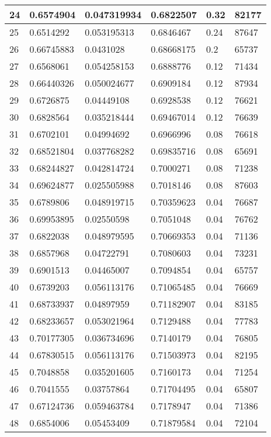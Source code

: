 \begin{longtable}{|l|l|l|l|l|l|}
24 & 0.6574904 & 0.047319934 & 0.6822507 & 0.32 & 82177 \\ \hline 
25 & 0.6514292 & 0.053195313 & 0.6846467 & 0.24 & 87647 \\ \hline 
26 & 0.66745883 & 0.0431028 & 0.68668175 & 0.2 & 65737 \\ \hline 
27 & 0.6568061 & 0.054258153 & 0.6888776 & 0.12 & 71434 \\ \hline 
28 & 0.66440326 & 0.050024677 & 0.6909184 & 0.12 & 87934 \\ \hline 
29 & 0.6726875 & 0.04449108 & 0.6928538 & 0.12 & 76621 \\ \hline 
30 & 0.6828564 & 0.035218444 & 0.69467014 & 0.12 & 76639 \\ \hline 
31 & 0.6702101 & 0.04994692 & 0.6966996 & 0.08 & 76618 \\ \hline 
32 & 0.68521804 & 0.037768282 & 0.69835716 & 0.08 & 65691 \\ \hline 
33 & 0.68244827 & 0.042814724 & 0.7000271 & 0.08 & 71238 \\ \hline 
34 & 0.69624877 & 0.025505988 & 0.7018146 & 0.08 & 87603 \\ \hline 
35 & 0.6789806 & 0.048919715 & 0.70359623 & 0.04 & 76687 \\ \hline 
36 & 0.69953895 & 0.02550598 & 0.7051048 & 0.04 & 76762 \\ \hline 
37 & 0.6822038 & 0.048979595 & 0.70669353 & 0.04 & 71136 \\ \hline 
38 & 0.6857968 & 0.04722791 & 0.7080603 & 0.04 & 73231 \\ \hline 
39 & 0.6901513 & 0.04465007 & 0.7094854 & 0.04 & 65757 \\ \hline 
40 & 0.6739203 & 0.056113176 & 0.71065485 & 0.04 & 76669 \\ \hline 
41 & 0.68733937 & 0.04897959 & 0.71182907 & 0.04 & 83185 \\ \hline 
42 & 0.68233657 & 0.053021964 & 0.7129488 & 0.04 & 77783 \\ \hline 
43 & 0.70177305 & 0.036734696 & 0.7140179 & 0.04 & 76805 \\ \hline 
44 & 0.67830515 & 0.056113176 & 0.71503973 & 0.04 & 82195 \\ \hline 
45 & 0.7048858 & 0.035201605 & 0.7160173 & 0.04 & 71254 \\ \hline 
46 & 0.7041555 & 0.03757864 & 0.71704495 & 0.04 & 65807 \\ \hline 
47 & 0.67124736 & 0.059463784 & 0.7178947 & 0.04 & 71386 \\ \hline 
48 & 0.6854006 & 0.05453409 & 0.71879584 & 0.04 & 72104 \\ \hline 

\end{longtable}
